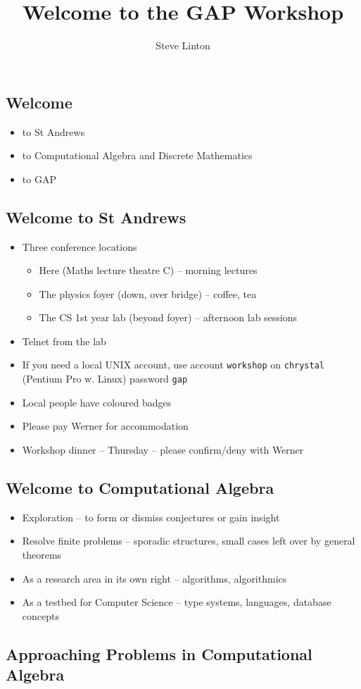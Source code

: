 \documentclass[11pt]{article}
\def\bs{\begin{slide}}
\def\es{\end{slide}}
\def\bi{\begin{itemize}}
\def\ei{\end{itemize}}
\def\GAP{\textsf{GAP}}
\begin{document}
\title[Welcome]{Welcome to the GAP Workshop}
\author{Steve Linton}
\titlepage
\begin{slide}
\Largesize
\subsection{Welcome}
\bi
\item to St Andrews
\item to Computational Algebra and Discrete Mathematics
\item to \GAP
\ei
\es
\bs
\subsection{Welcome to St Andrews}
\bi
\item Three conference locations
\bi
\item Here (Maths lecture theatre C) -- morning lectures
\item The physics foyer (down, over bridge) -- coffee, tea
\item The CS 1st year lab (beyond foyer) -- afternoon lab sessions
\ei
\item Telnet from the lab
\item If you need a local UNIX account, use account \texttt{workshop}
on  \texttt{chrystal} (Pentium Pro w. Linux) password \texttt{gap}
\item Local people have coloured badges
\item Please pay Werner for accommodation
\item Workshop dinner -- Thursday -- please confirm/deny with Werner
\ei
\es
\bs
\subsection{Welcome to Computational Algebra}

\bi
\item Exploration -- to form or dismiss conjectures or gain insight
\item Resolve finite problems -- sporadic structures, small cases left
over by general theorems
\item As a research area in its own right -- algorithms, algorithmics
\item As a testbed for Computer Science -- type systems, languages,
database concepts
\ei

\es
\bs
\subsection{Approaching Problems in Computational Algebra}


\end{slide}
\end{document}
